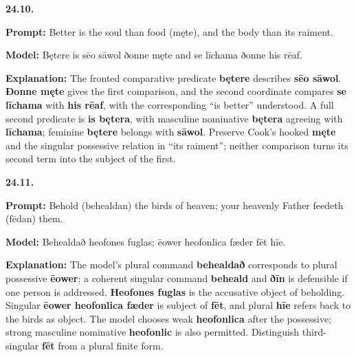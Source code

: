 \par\begin{minipage}{\linewidth}\raggedright
\textbf{24.10.}

\textbf{Prompt:} Better is the soul than food (męte), and the body than its raiment.

\textbf{Model:} Bętere is sēo sāwol ðonne męte and se līchama ðonne his rēaf.

\textbf{Explanation:} The fronted comparative predicate \textbf{bętere} describes \textbf{sēo sāwol}. \textbf{Ðonne męte} gives the first comparison, and the second coordinate compares \textbf{se līchama} with \textbf{his rēaf}, with the corresponding “is better” understood. A full second predicate is \textbf{is bętera}, with masculine nominative \textbf{bętera} agreeing with \textbf{līchama}; feminine \textbf{bętere} belongs with \textbf{sāwol}. Preserve Cook’s hooked \textbf{męte} and the singular possessive relation in “its raiment”; neither comparison turns its second term into the subject of the first.

\end{minipage}\par\addvspace{4pt}

\par\begin{minipage}{\linewidth}\raggedright
\textbf{24.11.}

\textbf{Prompt:} Behold (behealdan) the birds of heaven; your heavenly Father feedeth (fēdan) them.

\textbf{Model:} Behealdað heofones fuglas; ēower heofonlica fæder fēt hīe.

\textbf{Explanation:} The model’s plural command \textbf{behealdað} corresponds to plural possessive \textbf{ēower}; a coherent singular command \textbf{beheald} and \textbf{ðīn} is defensible if one person is addressed. \textbf{Heofones fuglas} is the accusative object of beholding. Singular \textbf{ēower heofonlica fæder} is subject of \textbf{fēt}, and plural \textbf{hīe} refers back to the birds as object. The model chooses weak \textbf{heofonlica} after the possessive; strong masculine nominative \textbf{heofonlic} is also permitted. Distinguish third-singular \textbf{fēt} from a plural finite form.

\end{minipage}\par\addvspace{4pt}

